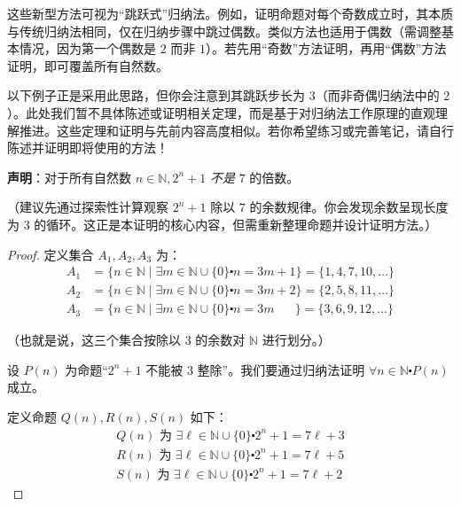 这些新型方法可视为``跳跃式''归纳法。例如，证明命题对每个奇数成立时，其本质与传统归纳法相同，仅在归纳步骤中跳过偶数。类似方法也适用于偶数（需调整基本情况，因为第一个偶数是 $2$ 而非 $1$）。若先用``奇数''方法证明，再用``偶数''方法证明，即可覆盖所有自然数。

以下例子正是采用此思路，但你会注意到其跳跃步长为 $3$（而非奇偶归纳法中的 $2$）。此处我们暂不具体陈述或证明相关定理，而是基于对归纳法工作原理的直观理解推进。这些定理和证明与先前内容高度相似。若你希望练习或完善笔记，请自行陈述并证明即将使用的方法！\\

\begin{example}
    
    \textbf{声明}：对于所有自然数 $n \in \mathbb{N}, 2^n+1$ \emph{不是} $7$ 的倍数。

    （建议先通过探索性计算观察 $2^n + 1$ 除以 $7$ 的余数规律。你会发现余数呈现长度为 $3$ 的循环。这正是本证明的核心内容，但需重新整理命题并设计证明方法。）

    \begin{proof}
        定义集合 $A_1, A_2, A_3$ 为：
        \begin{align*}
            A_1 &= \{n \in \mathbb{N} \mid \exists m \in \mathbb{N} \cup \{0\} \centerdot n = 3m + 1\} = \{1, 4, 7, 10, \dots \} \\
            A_2 &= \{n \in \mathbb{N} \mid \exists m \in \mathbb{N} \cup \{0\} \centerdot n = 3m + 2\} = \{2, 5, 8, 11, \dots \} \\
            A_3 &= \{n \in \mathbb{N} \mid \exists m \in \mathbb{N} \cup \{0\} \centerdot n = 3m \quad\:\:\:\} = \{3, 6, 9, 12, \dots \} 
        \end{align*}

        （也就是说，这三个集合按除以 $3$ 的余数对 $\mathbb{N}$ 进行划分。）

        设 $P(n)$ 为命题``$2^n+1$ 不能被 $3$ 整除''。我们要通过归纳法证明 $\forall n \in \mathbb{N} \centerdot P(n)$ 成立。

        定义命题 $Q(n), R(n), S(n)$ 如下：
        \begin{align*}
            Q(n) \text{\ 为\ } \exists \ell \in \mathbb{N} \cup \{0\} \centerdot 2^n + 1 = 7\ell + 3 \\
            R(n) \text{\ 为\ } \exists \ell \in \mathbb{N} \cup \{0\} \centerdot 2^n + 1 = 7\ell + 5 \\
            S(n) \text{\ 为\ } \exists \ell \in \mathbb{N} \cup \{0\} \centerdot 2^n + 1 = 7\ell + 2 
        \end{align*}


\end{proof}
\end{example}
